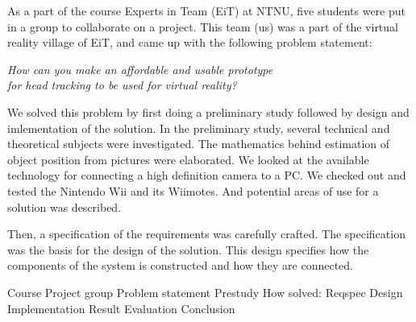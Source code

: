 As a part of the course Experts in Team (EiT) at NTNU, five students were put in a group to collaborate on a project. This team (us) was a part of the virtual reality village of EiT, and came up with the following problem statement:

\begin{center}\em How can you make an affordable and usable prototype\\for head tracking to be used for virtual reality?\end{center}
\vspace{\parskip}

We solved this problem by first doing a preliminary study followed by design and imlementation of the solution. In the preliminary study, several technical and theoretical subjects were investigated. The mathematics behind estimation of object position from pictures were elaborated. We looked at the available technology for connecting a high definition camera to a PC. We checked out and tested the Nintendo Wii and its Wiimotes. And potential areas of use for a solution was described.

Then, a specification of the requirements was carefully crafted. The specification was the basis for the design of the solution. This design specifies how the components of the system is constructed and how they are connected.

Course
Project group
Problem statement
Prestudy
How solved:
	Reqspec
	Design
	Implementation
Result
Evaluation
Conclusion